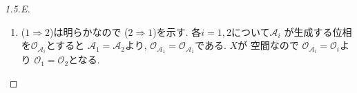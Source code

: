 \documentclass[uplatex, dvipdfmx, a4paper, 12pt, class=jsarticle, crop=false]{standalone}
\begin{document}
\begin{proof}[1.5.E]
\begin{enumerate}
		\item (\( 1 \Longrightarrow 2 \))は明らかなので
		(\( 2 \Longrightarrow 1 \))を示す.
		各\( i = 1, 2 \)について\( \mathscr{A}_i \)
		が生成する位相を\( \mathcal{O}_{\mathscr{A}_i} \)とすると
		\( \mathscr{A}_1 = \mathscr{A}_2 \)より,
		\( \mathcal{O}_{\mathscr{A}_1} = \mathcal{O}_{\mathscr{A}_1} \)である.
		\( X \)が  空間なので
		\( \mathcal{O}_{\mathscr{A}_i} = \mathcal{O}_i \)より
		\( \mathcal{O}_1 = \mathcal{O}_2 \)となる.
	\end{enumerate}
\end{proof}
\end{document}
